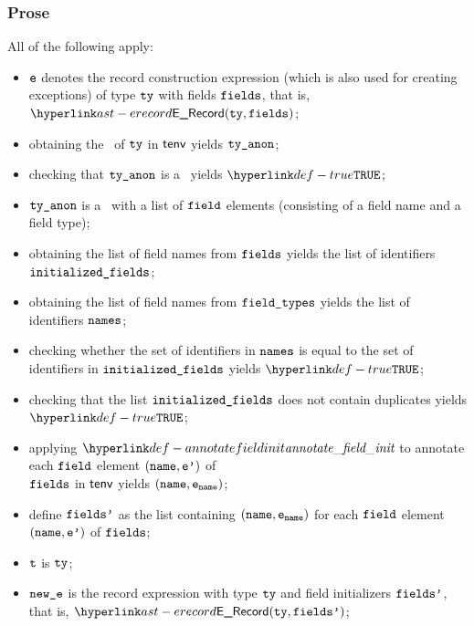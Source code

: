 \subsubsection{Prose}
All of the following apply:
\begin{itemize}
  \item $\texttt{e}$ denotes the record construction expression (which is also used for creating exceptions) of type $\texttt{ty}$ with fields $\texttt{fields}$,
        that is, $\ERecord(\tty, \vfields)$;
  \item obtaining the \underlyingtype\ of $\texttt{ty}$ in $\textsf{tenv}$ yields $\texttt{ty\_anon}$\ProseOrTypeError;
  \item checking that $\texttt{ty\_anon}$ is a \structuredtype\ yields $\True$\ProseOrTypeError;%
  \item $\texttt{ty\_anon}$ is a \structuredtype\ with a list of $\texttt{field}$ elements (consisting of a field name and a field type);
  \item obtaining the list of field names from $\texttt{fields}$ yields the list of identifiers \\
        $\texttt{initialized\_fields}$;
  \item obtaining the list of field names from $\texttt{field\_types}$ yields the list of identifiers $\texttt{names}$;
  \item checking whether the set of identifiers in $\texttt{names}$ is equal to the set of identifiers in $\texttt{initialized\_fields}$
        yields $\True$\ProseOrTypeError;
  \item checking that the list $\texttt{initialized\_fields}$ does not contain duplicates yields \\
        $\True$\ProseOrTypeError;
  \item applying $\annotatefieldinit$ to annotate each $\texttt{field}$ element $(\texttt{name},\texttt{e'})$ of \\
        $\texttt{fields}$ in $\textsf{tenv}$ yields $(\texttt{name},\texttt{e}_{\texttt{name}})$\ProseOrTypeError;
  \item define $\texttt{fields'}$ as the list containing $(\texttt{name},\texttt{e}_{\texttt{name}})$ for each $\texttt{field}$ element $(\texttt{name},\texttt{e'})$ of $\texttt{fields}$;
  \item $\texttt{t}$ is $\texttt{ty}$;
  \item $\texttt{new\_e}$ is the record expression with type $\texttt{ty}$ and field initializers $\texttt{fields'}$, that is, $\ERecord(\tty, \fieldsp)$;
\end{itemize}
